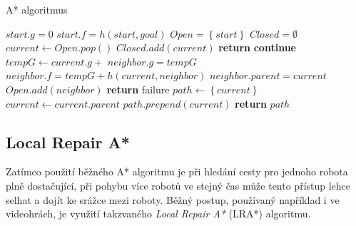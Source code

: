 %

\begin{algorithm}[H]
	\caption{A* algoritmus}
	\label{alg:Astar}
	\begin{algorithmic}[1]
		\State $start.g=0$
		\State $start.f=h(start,goal)$
		\State $Open=\left\{start\right\}$
		\State $Closed=\emptyset$
		\State $current\gets Open.pop()$
		\State $Closed.add(current)$
		\State \textbf{return} 
		\EndIf
		\State \textbf{continue}
		\EndIf
		\State $tempG\gets current.g+$
		\State $neighbor.g=tempG$
		\State $neighbor.f=tempG+h(current,neighbor)$
		\State $neighbor.parent=current$
		\State $Open.add(neighbor)$
		\EndIf
		\EndIf
		\EndFor
		\EndWhile
		\State \textbf{return} failure
		\EndFunction
		\Statex
		\State $path\gets\left\{current\right\}$
		\State $current\gets current.parent$
		\State $path.prepend(current)$
		\EndWhile
		\State \textbf{return} $path$
		\EndFunction
	\end{algorithmic}
\end{algorithm}

\subsection{Local Repair A*}
Zatímco použití běžného A* algoritmu je při hledání cesty pro jednoho robota plně dostačující, při pohybu více robotů ve stejný čas může tento přístup lehce selhat a dojít ke srážce mezi roboty. Běžný postup, používaný například i ve videohrách, je využití takzvaného \emph{Local Repair A*} (LRA*) algoritmu.


